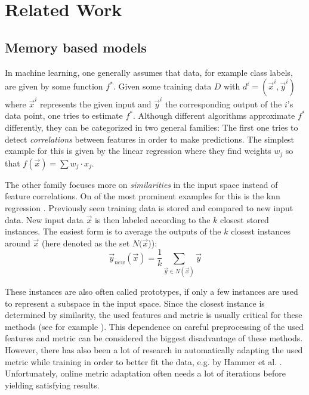 \chapter{Related Work \label{chap:stateOfTheArt}}



\section{Memory based models}

In machine learning, one generally assumes that data, for example class labels, are given by some function $f^*$. Given some training data $D$ with $d^i =(\vec{x}^i,\vec{y}^i)$ where $\vec{x}^i$ represents the given input and $\vec{y}^i$ the corresponding output of the $i$'s data point, one tries to estimate $f^*$. 
Although different algorithms approximate $f^*$ differently, they can be categorized in two general families: The first one tries to detect \textit{correlations} between features in order to make predictions. The simplest example for this is given by the linear regression \cite{linearRegression} where they find weights $w_j$ so that $f(\vec{x}) = \sum w_j \cdot x_j$. 

The other family focuses more on \textit{similarities} in the input space instead of feature correlations. On of the most prominent examples for this is the \gls{knn} regression \cite{kibler1987learning}. Previously seen training data is stored and compared to new input data. New input data $\vec{x}$ is then labeled according to the $k$ closest stored instances. The easiest form is to average the outputs of the $k$ closest instances around $\vec{x}$ (here denoted as the set $N(\vec{x}$)):
\begin{equation}
\vec{y}_{new}(\vec{x}) = \frac{1}{k} \sum_{\vec{y} \in N(\vec{x})} \vec{y}
\end{equation} %

These instances are also often called prototypes, if only a few instances are used to represent a subspace in the input space. Since the closest instance is determined by similarity, the used features and metric is usually critical for these methods (see for example \cite{metric1, metric2}). This dependence on careful preprocessing of the used features and metric can be considered the biggest disadvantage of these methods. However, there has also been a lot of research in automatically adapting the used metric while training in order to better fit the data, e.g. by Hammer et al. \cite{lvq}. Unfortunately, online metric adaptation often needs a lot of iterations before yielding satisfying results. 


